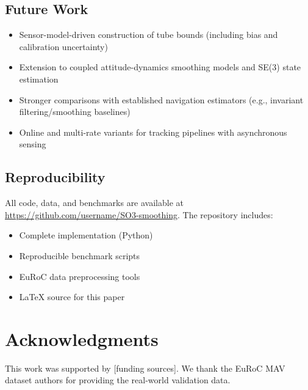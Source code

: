\documentclass[letterpaper, 10 pt, conference]{ieeeconf}
\begin{document}
\subsection{Future Work}
\begin{itemize}
\item Sensor-model-driven construction of tube bounds (including bias and calibration uncertainty)
\item Extension to coupled attitude-dynamics smoothing models and SE(3) state estimation
\item Stronger comparisons with established navigation estimators (e.g., invariant filtering/smoothing baselines)
\item Online and multi-rate variants for tracking pipelines with asynchronous sensing
\end{itemize}

\subsection{Reproducibility}

All code, data, and benchmarks are available at \url{https://github.com/username/SO3-smoothing}. The repository includes:
\begin{itemize}
\item Complete implementation (Python)
\item Reproducible benchmark scripts
\item EuRoC data preprocessing tools
\item LaTeX source for this paper
\end{itemize}

\section*{Acknowledgments}

This work was supported by [funding sources]. We thank the EuRoC MAV dataset authors for providing the real-world validation data.



\end{document}
